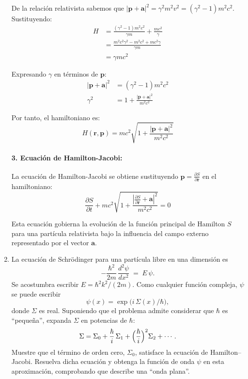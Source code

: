 \documentclass[12pt]{article}
\begin{document}
\begin{enumerate}
  De la relación relativista sabemos que $|\mathbf{p} + \mathbf{a}|^2 = \gamma^2 m^2 v^2 = (\gamma^2 - 1)m^2c^2$. Sustituyendo:
  \begin{align}
  H &= \frac{(\gamma^2 - 1)m^2c^2}{\gamma m} + \frac{mc^2}{\gamma} \\
  &= \frac{m^2c^2\gamma^2 - m^2c^2 + mc^2\gamma}{\gamma m} \\
  &= \gamma mc^2
  \end{align}

  Expresando $\gamma$ en términos de $\mathbf{p}$:
  \begin{align}
  |\mathbf{p} + \mathbf{a}|^2 &= (\gamma^2 - 1)m^2c^2 \\
  \gamma^2 &= 1 + \frac{|\mathbf{p} + \mathbf{a}|^2}{m^2c^2}
  \end{align}

  Por tanto, el hamiltoniano es:
  \[
  H(\mathbf{r}, \mathbf{p}) = mc^2\sqrt{1 + \frac{|\mathbf{p} + \mathbf{a}|^2}{m^2c^2}}
  \]

  \paragraph{3. Ecuación de Hamilton-Jacobi:}

  La ecuación de Hamilton-Jacobi se obtiene sustituyendo $\mathbf{p} = \frac{\partial S}{\partial \mathbf{r}}$ en el hamiltoniano:
  \[
  \frac{\partial S}{\partial t} + mc^2\sqrt{1 + \frac{\left|\frac{\partial S}{\partial \mathbf{r}} + \mathbf{a}\right|^2}{m^2c^2}} = 0
  \]

  Esta ecuación gobierna la evolución de la función principal de Hamilton $S$ para una partícula relativista bajo la influencia del campo externo representado por el vector $\mathbf{a}$.

  \item La ecuación de Schrödinger para una partícula libre en una dimensión es
    \[
      -\frac{\hbar^2}{2m}\,\frac{d^2\psi}{dx^2} \;=\; E\,\psi.
    \]
    Se acostumbra escribir \(E=\hbar^2k^2/(2m)\). Como cualquier función compleja, \(\psi\) se puede escribir
    \[
      \psi(x) = \exp\!\bigl(i\,\Sigma(x)/\hbar\bigr),
    \]
    donde \(\Sigma\) es real. Suponiendo que el problema admite considerar que \(\hbar\) es “pequeña”, expanda \(\Sigma\) en potencias de \(\hbar\):
    \[
      \Sigma = \Sigma_0 + \frac{\hbar}{i}\,\Sigma_1 + \Bigl(\frac{\hbar}{i}\Bigr)^2 \Sigma_2 + \cdots.
    \]
    Muestre que el término de orden cero, \(\Sigma_0\), satisface la ecuación de Hamilton–Jacobi. Resuelva dicha ecuación y obtenga la función de onda \(\psi\) en esta aproximación, comprobando que describe una “onda plana”.


\end{enumerate}
\end{document}
